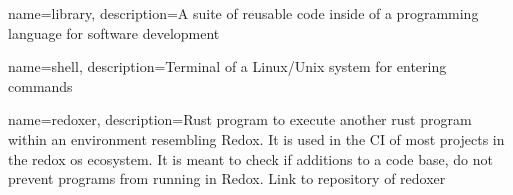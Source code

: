 {
	name={library},
	description={A suite of reusable code inside of a programming language for software development}
}


{
	name={shell},
	description={Terminal of a Linux/Unix system for entering commands}
}

{
	name={redoxer},
	description={Rust program to execute another rust program within an environment resembling Redox.
			It is used in the CI of most projects in the redox os ecosystem.
			It is meant to check if additions to a code base, do not prevent programs from running in Redox.
			Link to repository of redoxer \cite{link_repos_redoxer}}
}


\glsaddall
